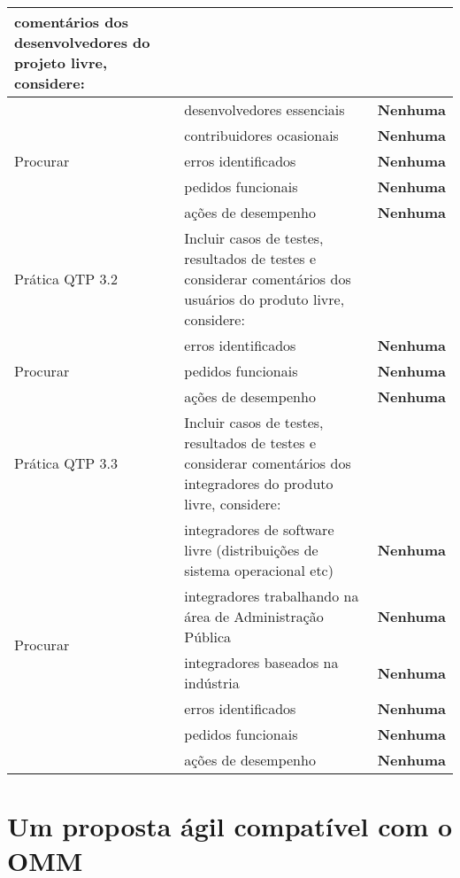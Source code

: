 \begin{longtable}{|p{2cm}|p{7cm}|p{7cm}|}
  comentários dos desenvolvedores do projeto livre, considere: & \\
  \hline \multirow{5}{*}{Procurar} & desenvolvedores essenciais &
  \textbf{Nenhuma} \\
  \cline{2-3} & contribuidores ocasionais & \textbf{Nenhuma} \\
  \cline{2-3} & erros identificados & \textbf{Nenhuma} \\
  \cline{2-3} & pedidos funcionais & \textbf{Nenhuma} \\
  \cline{2-3} & ações de desempenho & \textbf{Nenhuma} \\
  \hline \cellcolor[gray]{0.9} Prática QTP 3.2 & \cellcolor[gray]{0.9}
  Incluir casos de testes, resultados de testes e considerar
  comentários dos usuários do produto livre, considere: & \\
  \hline \multirow{3}{*}{Procurar} & erros identificados &
  \textbf{Nenhuma} \\
  \cline{2-3} & pedidos funcionais & \textbf{Nenhuma} \\
  \cline{2-3} & ações de desempenho & \textbf{Nenhuma} \\
  \hline \cellcolor[gray]{0.9} Prática QTP 3.3 & \cellcolor[gray]{0.9}
  Incluir casos de testes, resultados de testes e considerar
  comentários dos integradores do produto livre, considere: & \\
  \hline \multirow{6}{*}{Procurar} & integradores de software livre
  (distribuições de sistema operacional etc) &
  \textbf{Nenhuma} \\
  \cline{2-3} & integradores trabalhando na área de Administração Pública & \textbf{Nenhuma} \\
  \cline{2-3} & integradores baseados na indústria & \textbf{Nenhuma}
  \\
  \cline{2-3} & erros identificados & \textbf{Nenhuma} \\
  \cline{2-3} & pedidos funcionais & \textbf{Nenhuma} \\
  \cline{2-3} & ações de desempenho & \textbf{Nenhuma} \\
  \hline
\end{longtable}


\section{Um proposta ágil compatível com o OMM}
\label{sec:openagile-em-omm}

